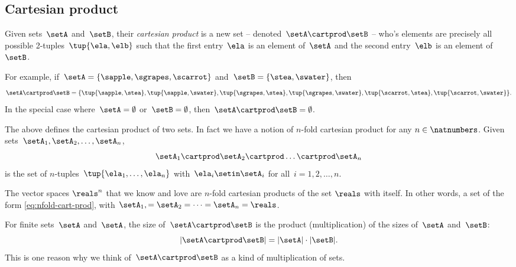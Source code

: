 \subsection{Cartesian product}\label{sec:cartesian-product}

Given sets~$\setA$ and~$\setB$, their \emph{cartesian product} is a new set -- denoted~$\setA \cartprod \setB$ -- who's elements are precisely all possible 2-tuples~$\tup{\ela, \elb}$ such that the first entry~$\ela$ is an element of~$\setA$ and the second entry~$\elb$ is an element of~$\setB$.

For example, if~$\setA = \{ \sapple, \sgrapes, \scarrot\}$ and~$\setB = \{ \stea, \swater \}$, then
\begin{equation*}
    \setA \cartprod \setB = \{ \tup{\sapple, \stea}, \tup{\sapple, \swater}, \tup{\sgrapes, \stea}, \tup{\sgrapes, \swater},  \tup{\scarrot, \stea}, \tup{\scarrot, \swater}\}.
\end{equation*}
In the special case where~$\setA = \emptyset$ or~$\setB = \emptyset$, then~$\setA \cartprod \setB = \emptyset$.

The above defines the cartesian product of two sets. In fact we have a notion of $n$-fold cartesian product for any $n \in \natnumbers$.
Given sets~$\setA_1, \setA_2, \ldots, \setA_n$, 
\begin{equation}\label{eq:nfold-cart-prod}
    \setA_1 \cartprod \setA_2 \cartprod \dots \cartprod \setA_n
\end{equation}
is the set of $n$-tuples~$\tup{\ela_1, \ldots, \ela_n}$ with~$\ela_i \setin\setA_i$ for all~$i = 1,2,\ldots,n$.


\begin{example}
The vector spaces $\reals^n$ that we know and love are $n$-fold cartesian products of the set $\reals$ with itself. In other words, a set of the form \ref{eq:nfold-cart-prod}, with $\setA_1, = \setA_2 = \dots = \setA_n = \reals$. 
\end{example}


\begin{remark}
    For finite sets~$\setA$ and~$\setA$, the size of~$\setA \cartprod \setB$ is the product (multiplication) of the sizes of~$\setA$ and~$\setB$:
    \begin{equation*}
        \vert \setA \cartprod \setB \vert = \vert \setA \vert \cdot \vert \setB \vert.
    \end{equation*}
    This is one reason why we think of~$\setA \cartprod \setB$ as a kind of multiplication of sets.
\end{remark}



